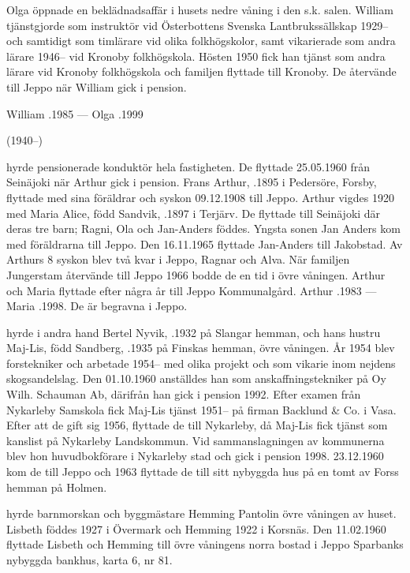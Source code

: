Olga öppnade en beklädnadsaffär i husets nedre våning i den s.k. salen.	William tjänstgjorde som instruktör vid Österbottens Svenska 	Lantbrukssällskap 1929-- och samtidigt som timlärare vid olika folkhögskolor, samt vikarierade som andra lärare 1946-- vid Kronoby folkhögskola. Hösten 1950 fick han tjänst som andra lärare vid Kronoby folkhögskola och familjen flyttade till Kronoby. De återvände till Jeppo när William gick i pension.

William .1985 	---  Olga .1999


 (1940--)

 hyrde pensionerade konduktör  hela fastigheten. De flyttade 25.05.1960 från Seinäjoki när Arthur gick i pension. Frans Arthur, .1895 i Pedersöre, Forsby, flyttade med sina föräldrar och syskon 09.12.1908 till Jeppo. Arthur vigdes 1920 med Maria Alice, född Sandvik, .1897 i Terjärv. De flyttade till Seinäjoki där deras tre barn; Ragni, Ola och Jan-Anders föddes. Yngsta sonen Jan Anders kom med föräldrarna till Jeppo. Den 16.11.1965 flyttade Jan-Anders till Jakobstad. Av Arthurs 8 syskon blev två kvar i Jeppo, Ragnar och Alva. När familjen Jungerstam återvände till Jeppo 1966 bodde de en tid i övre våningen. Arthur och Maria flyttade efter några år till Jeppo Kommunalgård.
Arthur .1983  ---  Maria .1998. De är begravna i Jeppo.

 hyrde i andra hand Bertel Nyvik, .1932 på Slangar hemman, och hans hustru Maj-Lis, född Sandberg, .1935 på Finskas hemman, övre våningen. År 1954 blev  forstekniker och arbetade 1954-- med olika projekt och som vikarie inom nejdens skogsandelslag. Den 01.10.1960 anställdes han som anskaffningstekniker på Oy Wilh. Schauman Ab, därifrån han gick i pension 1992. Efter examen från Nykarleby Samskola fick Maj-Lis tjänst 1951-- på firman Backlund \& Co. i Vasa. Efter att de gift sig 1956, flyttade de till Nykarleby, då Maj-Lis fick tjänst som kanslist på Nykarleby Landskommun. Vid sammanslagningen av kommunerna blev hon huvudbokförare i Nykarleby stad och gick i pension 1998. 23.12.1960 kom de till Jeppo och 1963 flyttade de till sitt nybyggda hus på en tomt av Forss hemman på Holmen.

 hyrde barnmorskan  och byggmästare Hemming Pantolin övre våningen av huset. Lisbeth föddes 1927 i Övermark och Hemming 1922 i Korsnäs. Den 11.02.1960 flyttade Lisbeth och Hemming till övre våningens norra bostad i Jeppo Sparbanks nybyggda bankhus, karta 6, nr 81.

